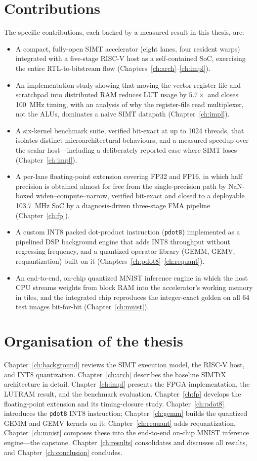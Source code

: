 \documentclass[12pt,a4paper,oneside]{report}
\newcommand{\code}[1]{\texttt{#1}}
\begin{document}
\section{Contributions}
The specific contributions, each backed by a measured result in this thesis, are:
\begin{itemize}
\item A compact, fully-open SIMT accelerator (eight lanes, four resident warps)
integrated with a five-stage RISC-V host as a self-contained SoC, exercising the
entire RTL-to-bitstream flow (Chapters~\ref{ch:arch}--\ref{ch:impl}).
\item An implementation study showing that moving the vector register file and
scratchpad into distributed RAM reduces LUT usage by $5.7\times$ and closes
\SI{100}{\mega\hertz} timing, with an analysis of why the register-file read
multiplexer, not the ALUs, dominates a naive SIMT datapath (Chapter~\ref{ch:impl}).
\item A six-kernel benchmark suite, verified bit-exact at up to 1024 threads,
that isolates distinct microarchitectural behaviours, and a measured speedup over
the scalar host---including a deliberately reported case where SIMT loses
(Chapter~\ref{ch:impl}).
\item A per-lane floating-point extension covering FP32 and FP16, in which half
precision is obtained almost for free from the single-precision path by NaN-boxed
widen--compute--narrow, verified bit-exact and closed to a deployable
\SI{103.7}{\mega\hertz} SoC by a diagnosis-driven three-stage FMA pipeline
(Chapter~\ref{ch:fp}).
\item A custom INT8 packed dot-product instruction (\code{pdot8}) implemented as
a pipelined DSP background engine that adds INT8 throughput without regressing
frequency, and a quantized operator library (GEMM, GEMV, requantization) built on
it (Chapters~\ref{ch:pdot8}--\ref{ch:requant}).
\item An end-to-end, on-chip quantized MNIST inference engine in which the host
CPU streams weights from block RAM into the accelerator's working memory in
tiles, and the integrated chip reproduces the integer-exact golden on all 64 test
images bit-for-bit (Chapter~\ref{ch:mnist}).
\end{itemize}

\section{Organisation of the thesis}
Chapter~\ref{ch:background} reviews the SIMT execution model, the RISC-V host, and
INT8 quantization. Chapter~\ref{ch:arch} describes the baseline SIMTiX
architecture in detail. Chapter~\ref{ch:impl} presents the FPGA implementation,
the LUTRAM result, and the benchmark evaluation. Chapter~\ref{ch:fp} develops the
floating-point extension and its timing-closure study. Chapter~\ref{ch:pdot8}
introduces the \code{pdot8} INT8 instruction; Chapter~\ref{ch:gemm} builds the
quantized GEMM and GEMV kernels on it; Chapter~\ref{ch:requant} adds
requantization. Chapter~\ref{ch:mnist} composes these into the end-to-end on-chip
MNIST inference engine---the capstone. Chapter~\ref{ch:results} consolidates and
discusses all results, and Chapter~\ref{ch:conclusion} concludes.
\end{document}
